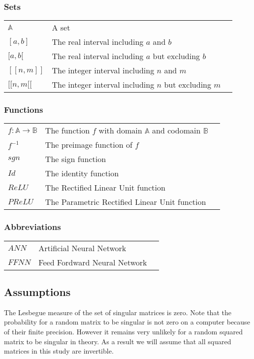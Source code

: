\documentclass{article}
\begin{document}
\subsubsection*{Sets}
\begin{tabular}{p{2cm}p{10cm}p{1cm}}
            $\mathbb{A}$   & A set  \\
            $[a,b]$ & The real interval including $a$ and $b$ \\
            $[a,b[$ & The real interval including $a$ but excluding $b$ \\
            $[\![n,m]\!]$ & The integer interval including $n$ and $m$ \\
            $[\![n,m[\![$ & The integer interval including $n$ but excluding $m$ \\
            \end{tabular}

\subsubsection*{Functions}
\begin{tabular}{p{2cm}p{10cm}p{1cm}}
        $f:\mathbb{A} \longrightarrow \mathbb{B}$   & The function $f$ with domain $\mathbb{A}$ and codomain $\mathbb{B}$ \\
        $f^{-1}$ & The preimage function of $f$ \\
        $sgn$ & The sign function \\
        $Id$ & The identity function \\
        $ReLU$ & The Rectified Linear Unit function \\
        $PReLU$ & The Parametric Rectified Linear Unit function \\
        \end{tabular}

\subsubsection*{Abbreviations}
\begin{tabular}{p{2cm}p{10cm}p{1cm}}
        $ANN$   & Artificial Neural Network\\
        $FFNN$ & Feed Fordward Neural Network \\
        \end{tabular}


\subsection*{Assumptions}
The Lesbegue measure of the set of singular matrices is zero. Note that the probability for a random matrix to be singular is not zero 
on a computer because of their finite precision. However it remains very unlikely for a random squared matrix to be singular in theory. 
As a result we will assume that all squared matrices in this study are invertible.
\newpage
\tableofcontents
\newpage
\end{document}
